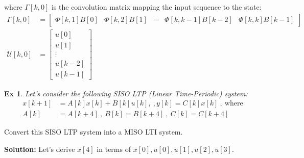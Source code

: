 \documentclass[twoside]{article}
\newtheorem{exmp}[theorem]{Ex}
\begin{document}
%
where $\Gamma[k,0]$ is the convolution matrix mapping the input sequence to the state:
%
\begin{align*}
    \Gamma[k,0] &= \left[ \begin{array}{c|c|c|c|c} \Phi[k,1] B[0] & \Phi[k,2] B[1]  & \cdots & \Phi[k,k-1] B[k-2]  & \Phi[k,k] B[k-1] \end{array} \right]
\\
    \mathcal{U}[k,0] &=  \left[ \begin{array}{c} u[0] \\ u[1] \\ \vdots \\ u[k-2] \\ u[k-1]  \end{array} \right]
\end{align*}
%

\begin{exmp}
Let's consider the following SISO LTP (Linear Time-Periodic) system:
 \begin{align*}
  x[k+1] &= A[k] x[k] + B[k] u[k] , \ , y[k] = C[k] x[k]  \ , \   \mathrm{where} \\
  A[k] &= A[k+4]  \ , \  B[k] = B[k+4]  \ , \ C[k] = C[k+4]
 \end{align*}
\end{exmp}
%
Convert this SISO LTP system into a MISO LTI system.

\textbf{Solution:} Let's derive $x[4]$ in terms of $x[0] , u[0] , u[1], u[2] , u[3]$.
\end{document}
